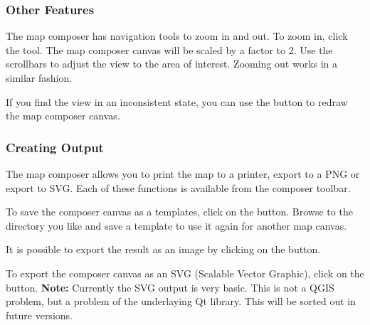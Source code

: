 \subsubsection{Other Features}

The map composer has navigation tools to zoom in and out. To zoom in, click
the  tool. The map composer canvas will be scaled by a factor to 2. Use
the scrollbars to adjust the view to the area of interest. Zooming out works
in a similar fashion.

If you find the view in an inconsistent state, you can use the  button
to redraw the map composer canvas.

\subsubsection{Creating Output}

The map composer allows you to print the map to a printer, export to a PNG or
export to SVG. Each of these functions is available from the composer toolbar.

To save the composer canvas as a templates, click on the
button. Browse to the directory 
you like and save a template to use it again for another map canvas.

It is possible to export the result as an image by clicking on the
button. 

To export the composer canvas as an  SVG (Scalable Vector Graphic), click on
the 
button. \textbf{Note:}
Currently the SVG output is very basic. This is not a QGIS problem, but a
problem of the underlaying Qt library. This will be sorted out in future versions.
 
